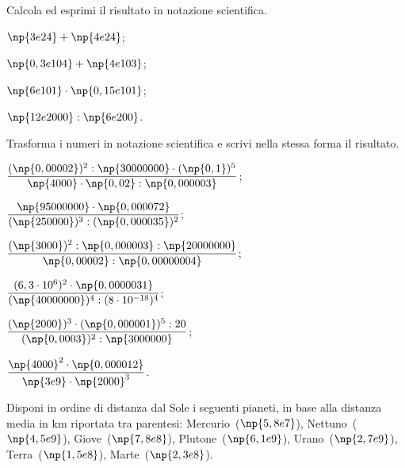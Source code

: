 \begin{esercizio}
 \label{ese:3.71}
Calcola ed esprimi il risultato in notazione scientifica.
\begin{multicols}{2}
\begin{enumeratea}
\item $\np{3e24}+\np{4e24}$;
\item $\np{0,3e104}+\np{4e103}$;
\item $\np{6e101}\cdot\np{0,15e101}$;
\item $\np{12e2000}:\np{6e200}$.
\end{enumeratea}
\end{multicols}
\end{esercizio}

\begin{esercizio}[\Ast]
 \label{ese:3.72}
Trasforma i numeri in notazione scientifica e scrivi nella stessa forma il risultato.
\begin{multicols}{2}
\begin{enumeratea}
\item $\dfrac{(\np{0,00002})^2:\np{30000000} \cdot (\np{0,1})^5}{\np{4000} \cdot \np{0,02}:\np{0,000003}}$;\vspace{1.1ex}
\item $\dfrac{\np{95000000}\cdot\np{0,000072}}{(\np{250000})^{3} :(\np{0,000035})^{2}}$;\vspace{1.1ex}
\item $\dfrac{(\np{3000})^2:\np{0,000003}:\np{20000000}}{\np{0,00002}:\np{0,00000004}}$;
\item $\dfrac{(6,3\cdot10^{6})^{2}\cdot \np{0,0000031}}{(\np{40000000})^4 : (8\cdot 10^{-18})^{4}}$;\vspace{1.1ex}
\item $\dfrac{(\np{2000})^3 \cdot (\np{0,000001})^5:20}{(\np{0,0003})^2:\np{3000000}}$;\vspace{1.1ex}
\item $\dfrac{\np{4000}^2\cdot \np{0,000012}}{\np{3e9}\cdot \np{2000}^3}$.
\end{enumeratea}
\end{multicols}
\end{esercizio}

\begin{esercizio}
 \label{ese:3.73}
Disponi in ordine di distanza dal Sole i seguenti pianeti, in base alla distanza media in km riportata
tra parentesi: Mercurio~($\np{5,8e7}$), Nettuno~($\np{4,5e9}$), Giove~($\np{7,8e8}$),
Plutone~($\np{6,1e9}$), Urano~($\np{2,7e9}$), Terra~($\np{1,5e8}$), Marte~($\np{2,3e8}$).
\end{esercizio}

